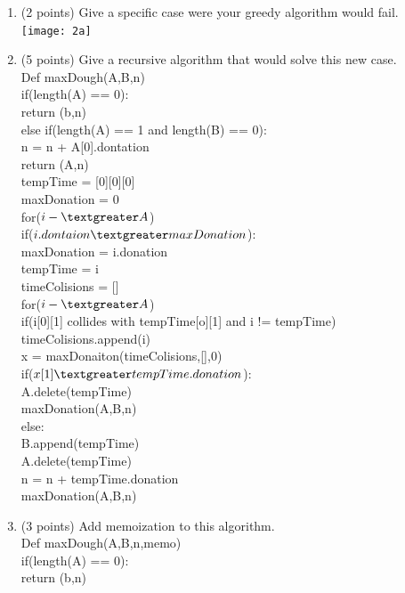 \documentclass[12pt]{article}
\newcommand\tab[1][1cm]{\hspace*{#1}}
\begin{document}
\begin{enumerate}
\begin{enumerate}
    \item \label{2a} (2 points) Give a specific case were your greedy algorithm would fail.\\
\texttt{[image: 2a]}
\pagebreak
    \item \label{2b} (5 points) Give a recursive algorithm that would solve this new case.\\
Def maxDough(A,B,n)\\
\tab if(length(A) == 0):\\
\tab \tab return (b,n)\\
\tab else if(length(A) == 1 and length(B) == 0):\\
\tab \tab n = n + A[0].dontation\\
\tab \tab return (A,n)\\
\tab tempTime = [0][0][0]\\
\tab maxDonation = 0\\
\tab for($i -\textgreater A$)\\
\tab \tab if($i.dontaion \textgreater maxDonation$):\\
\tab \tab maxDonation = i.donation\\
\tab \tab tempTime = i\\
\tab timeColisions = []\\
\tab for($i -\textgreater A$)\\
\tab \tab if(i[0][1] collides with tempTime[o][1] and i != tempTime)\\
\tab \tab \tab timeColisions.append(i)\\
\tab x = maxDonaiton(timeColisions,[],0)\\
\tab if($x[1] \textgreater tempTime.donation$):\\
\tab \tab A.delete(tempTime)\\
\tab \tab maxDonation(A,B,n)\\
\tab else:\\
\tab \tab B.append(tempTime)\\
\tab \tab A.delete(tempTime)\\
\tab \tab n = n + tempTime.donation\\
\tab \tab maxDonation(A,B,n)\\
\pagebreak
    \item \label{2c} (3 points) Add memoization to this algorithm.\\
Def maxDough(A,B,n,memo)\\
\tab if(length(A) == 0):\\
\tab \tab return (b,n)\\

\end{enumerate}
\end{enumerate}
\end{document}

